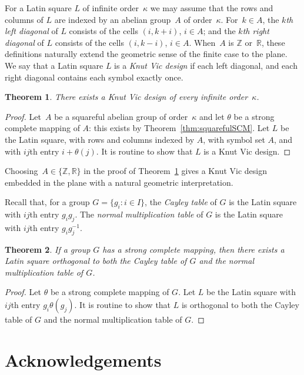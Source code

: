 \documentclass[12pt,a4paper]{article}
\newtheorem{thm}{Theorem}[section]
\newcommand{\Z}{\mathbb{Z}}
\newcommand{\R}{\mathbb{R}}
\begin{document}
For a Latin square $L$ of infinite order~$\kappa$ we may assume that the rows and columns of $L$ are indexed by an abelian group~$A$ of order~$\kappa$.  For~$k \in A$, the {\em $k$th left diagonal} of $L$ consists of the cells $(i,k+i)$, $i\in A$; and the {\em $k$th right diagonal} of $L$ consists of the cells $(i,k-i)$, $i\in A$.  When~$A$ is $\Z$ or~$\R$, these definitions naturally extend the geometric sense of the finite case to the plane.   We say that a Latin square $L$ is a {\em Knut Vic design} if each left diagonal, and each right diagonal contains each symbol exactly once.

\begin{thm}\label{th:infKV}
There exists a Knut Vic design of every infinite order~$\kappa$.
\end{thm}
\begin{proof}
Let~$A$ be a squareful abelian group of order~$\kappa$ and let $\theta$ be a strong complete mapping of $A$: this exists by Theorem~\ref{thm:squarefulSCM}. Let $L$ be the Latin square, with rows and columns indexed by $A$, with symbol set $A$, and with $ij$th entry $i+\theta(j)$. It is routine to show that $L$ is a Knut Vic design.
\end{proof}

Choosing~$A \in \{ \Z, \R \}$ in the proof of Theorem~\ref{th:infKV} gives a Knut Vic design embedded in the plane with a natural geometric interpretation.

Recall that, for a group $G=\{g_i : i\in I\}$, the {\em Cayley table} of $G$ is the Latin square with $ij$th entry $g_ig_j$. The {\em normal multiplication table} of $G$ is the Latin square with $ij$th entry $g_ig_j^{-1}$.

\begin{thm}
If a group $G$ has a strong complete mapping, then there exists a Latin square orthogonal to both the Cayley table of $G$ and the normal multiplication table of $G$.
\end{thm}
\begin{proof}
Let $\theta$ be a strong complete mapping of $G$. Let $L$ be the Latin square with $ij$th entry $g_i\theta(g_j)$. It is routine to show that $L$ is orthogonal to both the Cayley table of $G$ and the normal multiplication table of $G$.
\end{proof}


\section*{Acknowledgements}
\end{document}
